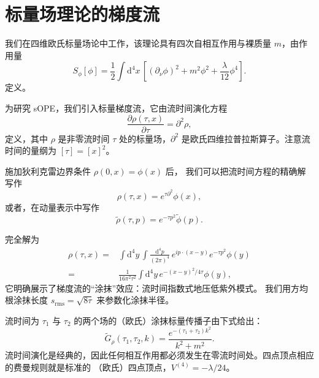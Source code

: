 \section{\label{sec:phi4}标量场理论的梯度流}

我们在四维欧氏标量场论中工作，该理论具有四次自相互作用与裸质量 $m$，由作用量
\begin{equation}
S_\phi[\phi] = \frac{1}{2}\int \mathrm{d}^4x\, \left[(\partial_\nu
\phi)^2 + m^2\phi^2 + \frac{\lambda}{12}\phi^4\right].
\end{equation}
定义。

为研究 sOPE，我们引入标量梯度流，它由流时间演化方程
\begin{equation}
\frac{\partial \rho(\tau,x)}{\partial \tau}= \partial^2 \rho,
\end{equation}
定义，其中 $\rho$ 是非零流时间 $\tau$ 处的标量场，$\partial^2$
是欧氏四维拉普拉斯算子。注意流时间的量纲为 $[\tau] = [x]^2$。

施加狄利克雷边界条件 $\rho(0,x) = \phi(x)$ 后，
我们可以把流时间方程的精确解写作
\begin{equation}\label{eq:rhoexp}
\rho(\tau,x) = e^{\tau\partial^2}\phi(x),
\end{equation}
或者，在动量表示中写作
\begin{equation}
\tilde{\rho}(\tau,p) = e^{-\tau p^2}\tilde{\phi}(p).
\end{equation}

完全解为
\begin{align}
\rho(\tau,x) = {} & \int\mathrm{d}^4y\,\int \frac{\mathrm{d}^4p}{(2\pi)^4}
\,e^{ip\cdot(x-y)} e^{-\tau p^2} \phi(y) \nonumber\\
= {} &  \frac{1}{16\pi^2\tau^2}
\int\mathrm{d}^4y\,e^{-(x-y)^2/4\tau}\phi(y),
\end{align}
它明确展示了梯度流的``涂抹''效应：流时间指数式地压低紫外模式。
我们用方均根涂抹长度 $s_{\mathrm{rms}} = \sqrt{8\tau}$ 来参数化涂抹半径。

流时间为 $\tau_1$ 与 $\tau_2$ 的两个场的（欧氏）涂抹标量传播子由下式给出：
\begin{equation}
\widetilde{G}_\rho(\tau_1,\tau_2,k) = \frac{e^{-(\tau_1+\tau_2) k^2}}{k^2+m^2}.
\end{equation}
流时间演化是经典的，因此任何相互作用都必须发生在零流时间处。四点顶点相应的费曼规则就是标准的
（欧氏）四点顶点，$V^{(4)} = -\lambda/24$。
